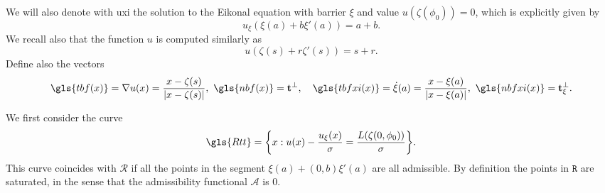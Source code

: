 \documentclass[reqno]{amsart}
\theoremstyle{definition} \newtheorem{definition}{Definition}[section]
\theoremstyle{definition} \newtheorem{remark}[definition]{Remark}
\theoremstyle{plain} \newtheorem{lemma}[definition]{Lemma}
\theoremstyle{plain} \newtheorem{proposition}[definition]{Proposition}
\theoremstyle{plain} \newtheorem{theorem}[definition]{Theorem}
\theoremstyle{plain} \newtheorem{corollary}[definition]{Corollary}
\theoremstyle{definition} \newtheorem{example}[definition]{Example}
\theoremstyle{plain} \newtheorem{claim}[clai]{Claim}
\theoremstyle{definition} \newtheorem{assumption}[definition]{Assumption}
\theoremstyle{definition} \newtheorem{observation}[definition]{Observation}
\newcommand{\1}{\mathbbm 1}
\numberwithin{equation}{section} %
\theoremstyle{plain} \newtheorem*{theorem*}{Theorem}
\theoremstyle{plain} \newtheorem{mthm}[maintheorem]{Main Theorem}
\theoremstyle{plain} \newtheorem*{mthm*}{Main Theorem}
\theoremstyle{plain} \newtheorem*{conjecture*}{Conjecture}
\theoremstyle{plain} \newtheorem{conjecture}[definition]{Conjecture}
\theoremstyle{plain} \newtheorem*{problem*}{Problem}
\begin{document}
We will also denote with  \gls{uxi} the solution to the Eikonal equation with barrier $\xi$ and value $u(\zeta(\phi_0)) = 0$, which is explicitly given by
\begin{equation*}
u_\xi(\xi(a) + b \xi'(a)) = a + b.
\end{equation*}
We recall also that the function $u$ is computed similarly as
\begin{equation*}
u(\zeta(s) + r \zeta'(s)) = s + r.
\end{equation*}
Define also the vectors    
\begin{equation*}
\gls{tbf(x)} = \nabla u(x) = \frac{x-\zeta(s)}{|x - \zeta(s)|}, \ \gls{nbf(x)} = \mathbf t^\perp, \quad \gls{tbfxi(x)} = \dot \xi(a) = \frac{x-\xi(a)}{|x - \xi(a)|}, \ \gls{nbfxi(x)} = \mathbf t^\perp_\xi.
\end{equation*}

We first consider the curve 
\begin{equation*}
\gls{Rtt} = \bigg\{ x : u(x) - \frac{u_\xi(x)}{\sigma} = \frac{L(\zeta(0,{\phi_0}))}{\sigma} \bigg\}. 
\end{equation*}
This curve coincides with $\mathcal R$ if all the points in the segment $\xi(a) + (0,b) \xi'(a)$ are all admissible. By definition the points in $\mathtt R$ are saturated, in the sense that the admissibility functional $\mathcal A$ is $0$.
\end{document}

